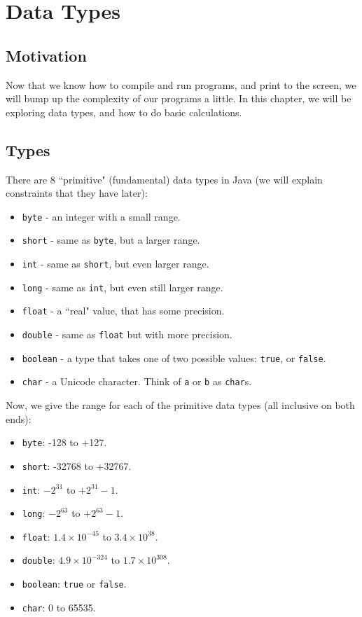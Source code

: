 \section{Data Types}

\subsection{Motivation}
Now that we know how to compile and run programs, and print to the screen, we will bump up the complexity of our programs a little. In this chapter, we will be exploring data types, and how to do basic calculations.

\subsection{Types}
There are 8 ``primitive" (fundamental) data types in Java (we will explain constraints that they have later):
\begin{itemize}
\item \verb|byte| - an integer with a small range.
\item \verb|short| - same as \verb|byte|, but a larger range.
\item \verb|int| - same as \verb|short|, but even larger range.
\item \verb|long| - same as \verb|int|, but even still larger range.
\item \verb|float| - a ``real" value, that has some precision.
\item \verb|double| - same as \verb|float| but with more precision.
\item \verb|boolean| - a type that takes one of two possible values: \verb|true|, or \verb|false|.
\item \verb|char| - a Unicode character. Think of \verb|a| or \verb|b| as \verb|char|s.
\end{itemize}

\noindent Now, we give the range for each of the primitive data types (all inclusive on both ends):
\begin{itemize}
\item \verb|byte|: -128 to +127.
\item \verb|short|: -32768 to +32767.
\item \verb|int|: $-2^{31}$ to $+2^{31}-1$.
\item \verb|long|: $-2^{63}$ to $+2^{63}-1$.
\item \verb|float|: $1.4 \times 10^{-45}$ to $3.4 \times 10^{38}$.
\item \verb|double|: $4.9 \times 10^{-324}$ to $1.7 \times 10^{308}$.
\item \verb|boolean|: \verb|true| or \verb|false|.
\item \verb|char|: 0 to 65535.
\end{itemize}

